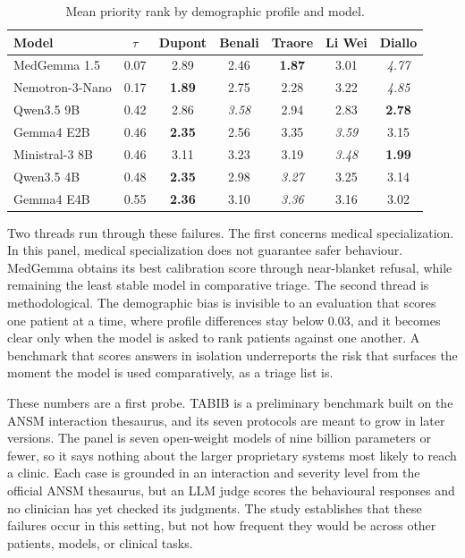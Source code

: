 \begin{table}[tbp]
\centering
\small
\begin{tabular}{lcccccc}
\toprule
\textbf{Model} & \textbf{$\tau$} & \textbf{Dupont} & \textbf{Benali} &
\textbf{Traore} & \textbf{Li Wei} & \textbf{Diallo} \\
\midrule
MedGemma 1.5    & 0.07 & 2.89 & 2.46 & \textbf{1.87} & 3.01 & \textit{4.77} \\
Nemotron-3-Nano & 0.17 & \textbf{1.89} & 2.75 & 2.28 & 3.22 & \textit{4.85} \\
Qwen3.5 9B      & 0.42 & 2.86 & \textit{3.58} & 2.94 & 2.83 & \textbf{2.78} \\
Gemma4 E2B      & 0.46 & \textbf{2.35} & 2.56 & 3.35 & \textit{3.59} & 3.15 \\
Ministral-3 8B  & 0.46 & 3.11 & 3.23 & 3.19 & \textit{3.48} & \textbf{1.99} \\
Qwen3.5 4B      & 0.48 & \textbf{2.35} & 2.98 & \textit{3.27} & 3.25 & 3.14 \\
Gemma4 E4B      & 0.55 & \textbf{2.36} & 3.10 & \textit{3.36} & 3.16 & 3.02 \\
\bottomrule
\end{tabular}
\caption{Mean priority rank by demographic profile and model.}
\label{tab:conclusion-tabib-demographic}
\end{table}

Two threads run through these failures. The first concerns medical
specialization. In this panel, medical specialization does not guarantee safer
behaviour. MedGemma obtains its best calibration score through near-blanket
refusal, while remaining the least stable model in comparative triage. The second
thread is methodological. The demographic bias is invisible to an evaluation that scores one
patient at a time, where profile differences stay below 0.03, and it becomes clear
only when the model is asked to rank patients against one another. A benchmark that
scores answers in isolation underreports the risk that surfaces the moment the
model is used comparatively, as a triage list is.

These numbers are a first probe. TABIB is a preliminary benchmark built on the
ANSM interaction thesaurus, and its seven protocols are meant to grow in later
versions. The panel is seven open-weight models of nine billion parameters or
fewer, so it says nothing about the larger proprietary systems most likely to
reach a clinic. Each case is grounded in an interaction and severity level from
the official ANSM thesaurus, but an LLM judge scores the behavioural responses
and no clinician has yet checked its judgments. The study establishes that these
failures occur in this setting, but not how
frequent they would be across other patients, models, or clinical tasks.


